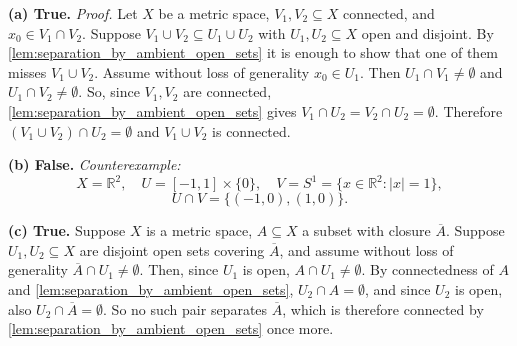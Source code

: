 \begin{exercisesolution}
\textbf{(a) True.} \textit{Proof.} Let $X$ be a metric space, $V_1, V_2 \subseteq X$ connected,
and $x_0 \in V_1 \cap V_2$. Suppose $V_1 \cup V_2 \subseteq U_1 \cup U_2$ with
$U_1, U_2 \subseteq X$ open and disjoint. By \cref{lem:separation_by_ambient_open_sets} it is
enough to show that one of them misses $V_1 \cup V_2$. Assume without loss of generality
$x_0 \in U_1$. Then $U_1 \cap V_1 \neq \emptyset$ and $U_1 \cap V_2 \neq \emptyset$. So, since
$V_1, V_2$ are connected, \cref{lem:separation_by_ambient_open_sets} gives
$V_1 \cap U_2 = V_2 \cap U_2 = \emptyset$. Therefore $(V_1 \cup V_2) \cap U_2 = \emptyset$ and
$V_1 \cup V_2$ is connected.

\textbf{(b) False.} \textit{Counterexample:}
\[
X = \mathbb{R}^2, \quad U = [-1,1] \times \{0\}, \quad V = S^1 = \{x \in \mathbb{R}^2 : |x| = 1\},
\]
\[
U \cap V = \{(-1,0), (1,0)\}.
\]

\textbf{(c) True.} Suppose $X$ is a metric space, $A \subseteq X$ a subset with closure
$\overline{A}$. Suppose $U_1, U_2 \subseteq X$ are disjoint open sets covering $\overline{A}$, and
assume without loss of generality $\overline{A} \cap U_1 \neq \emptyset$. Then, since $U_1$ is
open, $A \cap U_1 \neq \emptyset$. By connectedness of $A$ and
\cref{lem:separation_by_ambient_open_sets}, $U_2 \cap A = \emptyset$, and since $U_2$ is open,
also $U_2 \cap \overline{A} = \emptyset$. So no such pair separates $\overline{A}$, which is
therefore connected by \cref{lem:separation_by_ambient_open_sets} once more.
\end{exercisesolution}



